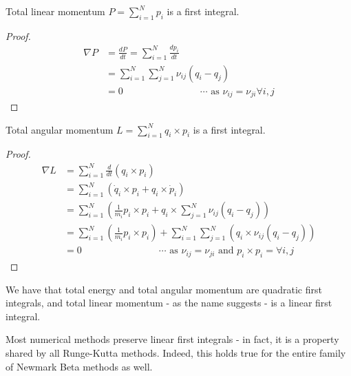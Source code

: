 \documentclass[../Main.tex]{subfiles}
\begin{document}
\begin{theorem} Total linear momentum $P = \sum_{i=1}^{N} p_{i}$ is a first integral. \end{theorem}
\begin{proof}
\begin{align*}
\nabla P & = \frac{dP}{dt} = \sum_{i=1}^{N} \frac{dp_{i}}{dt} \\
&=\sum_{i=1}^{N}\sum_{j=1}^{N}\nu_{ij}\left(q_{i} - q_{j}\right) \\
& = 0 \qquad \qquad \qquad \qquad \cdots \mbox{ as }\nu_{ij} = \nu_{ji} \forall i, j
\end{align*}
\end{proof} 

\begin{theorem} Total angular momentum $L = \sum_{i=1}^{N} q_{i} \times p_{i}$ is a first integral. \end{theorem}
\begin{proof}
\begin{align*}
\nabla L & = \sum_{i=1}^{N} \frac{d}{dt} \left(q_{i} \times p_{i}\right) \\
& = \sum_{i=1}^{N} \left(\dot{q}_{i} \times p_{i} + {q}_{i} \times \dot{p}_{i}\right) \\  
& = \sum_{i=1}^{N} \left( \frac{1}{m_{i}}p_{i} \times p_{i} + q_{i} \times \sum_{j=1}^{N}\nu_{ij}\left(q_{i} - q_{j}\right)\right) \\  
& = \sum_{i=1}^{N} \left( \frac{1}{m_{i}}p_{i} \times p_{i}\right) +  \sum_{i=1}^{N}\sum_{j=1}^{N} \left(q_{i} \times \nu_{ij}\left(q_{i} - q_{j}\right)\right) \\
& = 0  \qquad \qquad \qquad \qquad \cdots \mbox{ as }\nu_{ij} = \nu_{ji} \mbox{ and } p_{i} \times p_{i} =  \forall i, j
\end{align*}
\end{proof}
 We have that total energy and total angular momentum are quadratic first integrals, and total linear momentum - as the name suggests - is a linear first integral.

Most numerical methods preserve linear first integrals - in fact, it is a property shared by all Runge-Kutta methods. Indeed, this holds true for the entire family of Newmark Beta methods as well.
\end{document}
